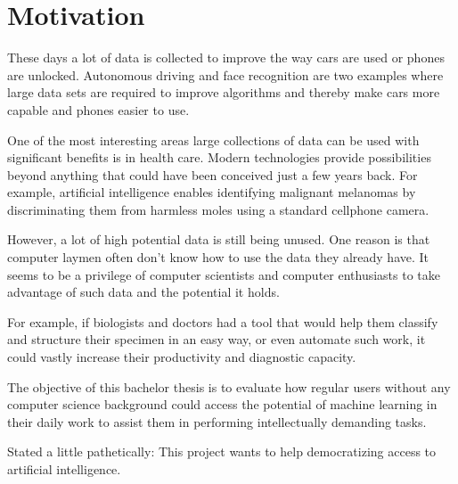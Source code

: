 \chapter{Motivation}

These days a lot of data is collected to improve the way cars are used or phones are unlocked. Autonomous driving and face recognition are two examples where large data sets are required to improve algorithms and thereby make cars more capable and phones easier to use. 

One of the most interesting areas large collections of data can be
used with significant benefits is in health care. Modern
technologies provide
possibilities beyond anything that could have been 
conceived just a few years back. 
For example, artificial
intelligence enables identifying malignant melanomas by
discriminating them from harmless moles using a standard cellphone camera.

However, a lot of high potential data is still being unused. 
One reason is that computer laymen often don't know how to use the data they already have. 
It seems to be a privilege of computer scientists and computer enthusiasts to take advantage of such data and the potential it holds. 

For example, if biologists and doctors had a tool that would 
help them classify and structure their specimen
in an easy way, or even automate such work, it could vastly
increase their productivity and diagnostic capacity.

The objective of this bachelor thesis is to evaluate how regular
users without any computer science background could access the
potential of machine learning in their daily work to assist them
in performing intellectually demanding tasks. 

Stated a little pathetically: This project wants to help democratizing access to artificial intelligence.